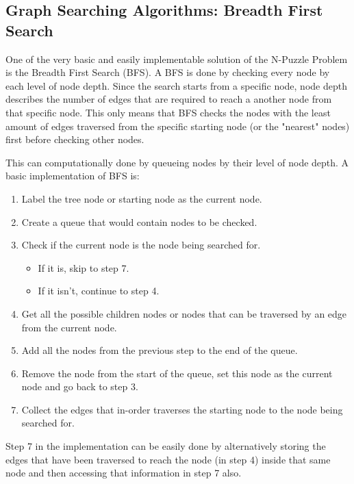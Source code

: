 \subsection{Graph Searching Algorithms: Breadth First Search}

\par One of the very basic and easily implementable solution of the N-Puzzle Problem is the Breadth First Search (BFS). A BFS is done by checking every node by each level of node depth. Since the search starts from a specific node, node depth describes the number of edges that are required to reach a another node from that specific node. This only means that BFS checks the nodes with the least amount of edges traversed from the specific starting node (or the "nearest" nodes) first before checking other nodes.\cite{bfs}

\par This can computationally done by queueing nodes by their level of node depth. A basic implementation of BFS is:
\begin{enumerate}
\item Label the tree node or starting node as the current node.
\item Create a queue that would contain nodes to be checked.
\item Check if the current node is the node being searched for.
  \begin{itemize}
  \item If it is, skip to step 7.
  \item If it isn't, continue to step 4.
  \end{itemize}
\item Get all the possible children nodes or nodes that can be traversed by an edge from the current node.
\item Add all the nodes from the previous step to the end of the queue.
\item Remove the node from the start of the queue, set this node as the current node and go back to step 3.
\item Collect the edges that in-order traverses the starting node to the node being searched for.
\end{enumerate}

\par Step 7 in the implementation can be easily done by alternatively storing the edges that have been traversed to reach the node (in step 4) inside that same node and then accessing that information in step 7 also.

